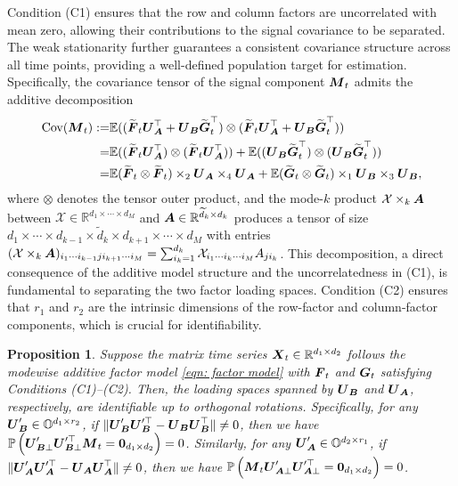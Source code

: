 \documentclass[11pt,letterpaper]{article}
\newtheorem{proposition}{Proposition}[section]
\theoremstyle{definition}
\renewcommand{\tilde}{\widetilde}
\newcommand{\cano}[1]{\widetilde{\mathbf{#1}}}
\begin{document}
Condition (C1) ensures that the row and column factors are uncorrelated with mean zero, allowing their contributions to the signal covariance to be separated. The weak stationarity further guarantees a consistent covariance structure across all time points, providing a well-defined population target for estimation. Specifically, the covariance tensor of the signal component $\boldsymbol{M}_t$ admits the additive decomposition
\begin{align}\label{eqn: covariance tensor}
\text{Cov}(\bM_t) 
:= & \EE((\cano\bF_t\bU_{\bA}^{\top} + \bU_{\bB}\cano\bG_t^{\top}) \otimes (\cano\bF_t\bU_{\bA}^{\top} + \bU_{\bB}\cano\bG_t^{\top})) \notag\\
= & \EE((\cano\bF_t \bU_{\bA}^{\top}) \otimes (\cano\bF_t\bU_{\bA}^{\top})) + \EE((\bU_{\bB}\cano\bG_t^{\top}) \otimes (\bU_{\bB}\cano\bG_t^{\top})) \notag\\
= &\EE(\cano\bF_t \otimes \cano\bF_t) \times_2 \bU_{\bA} \times_4 \bU_{\bA} + \EE(\cano\bG_t \otimes \cano\bG_t) \times_1 \bU_{\bB} \times_3 \bU_{\bB} ,    
\end{align}
where $\otimes$ denotes the tensor outer product, and the mode-$k$ product ${\cal X}\times_k \boldsymbol{A}$ between $\mathcal{X}\in\mathbb{R}^{d_1\times\cdots\times d_M}$ and $\bA\in\mathbb{R}^{\tilde d_k\times d_k}$ produces a tensor of size $d_1\times\cdots\times d_{k-1}\times\tilde d_k\times d_{k+1}\times\cdots\times d_M$ with entries  
$({\cal X}\times_k \boldsymbol{A})_{i_1\cdots i_{k-1} j i_{k+1}\cdots i_M} = \sum_{i_k=1}^{d_k}\mathcal{X}_{i_1\cdots i_k\cdots i_M}A_{j i_k}$. This decomposition, a direct consequence of the additive model structure and the uncorrelatedness in (C1), is fundamental to separating the two factor loading spaces. Condition (C2) ensures that $r_1$ and $r_2$ are the intrinsic dimensions of the row-factor and column-factor components, which is crucial for identifiability.




\begin{proposition}\label{prop: identifiability}
Suppose the matrix time series $\boldsymbol{X}_t \in \mathbb{R}^{d_1 \times d_2}$ follows the modewise additive factor model \eqref{eqn: factor model} with $\boldsymbol{F}_t$ and $\boldsymbol{G}_t$ satisfying Conditions (C1)--(C2). Then, the loading spaces spanned by \(\boldsymbol{U}_{\boldsymbol{B}}\) and \(\boldsymbol{U}_{\boldsymbol{A}}\), respectively, are identifiable up to orthogonal rotations. Specifically, for any $\boldsymbol{U}_{\boldsymbol{B}}^{\prime} \in \mathbb{O}^{d_1 \times r_2}$, if $\|\boldsymbol{U}_{\boldsymbol{B}}^{\prime}\boldsymbol{U}_{\boldsymbol{B}}^{\prime \top} - \boldsymbol{U}_{\boldsymbol{B}}\boldsymbol{U}_{\boldsymbol{B}}^{\top}\| \neq 0$, then we have $\mathbb{P}\left(\boldsymbol{U}_{\boldsymbol{B}\perp}^{\prime}\boldsymbol{U}_{\boldsymbol{B}\perp}^{\prime \top}\boldsymbol{M}_t = \mathbf{0}_{d_1 \times d_2} \right) = 0$. Similarly, for any $\boldsymbol{U}_{\boldsymbol{A}}^{\prime} \in \mathbb{O}^{d_2 \times r_1}$, if $\|\boldsymbol{U}_{\boldsymbol{A}}^{\prime}\boldsymbol{U}_{\boldsymbol{A}}^{\prime \top} - \boldsymbol{U}_{\boldsymbol{A}}\boldsymbol{U}_{\boldsymbol{A}}^{\top}\| \neq 0$, then we have $\mathbb{P}\left(\boldsymbol{M}_t\boldsymbol{U}_{\boldsymbol{A}\perp}^{\prime}\boldsymbol{U}_{\boldsymbol{A}\perp}^{\prime \top} = \mathbf{0}_{d_1 \times d_2} \right) = 0$.
\end{proposition}
\end{document}
